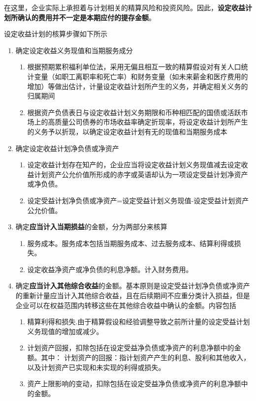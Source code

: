 \documentclass[UTF8,12pt]{ctexart}
\numberwithin{equation}{section} %
\numberwithin{figure}{section}
\numberwithin{table}{section}
\begin{document}
	在这里，企业实际上承担着与计划相关的精算风险和投资风险。因此，\textbf{设定收益计划所确认的费用并不一定是本期应付的提存金额}。
	
	设定收益计划的核算步骤如下所示
	\begin{enumerate}
		\item 确定设定收益义务现值和当期服务成分
		\begin{enumerate}
			\item 根据预期累积福利单位法，采用无偏且相互一致的精算假设对有关人口统计变量（如职工离职率和死亡率）和财务变量（如未来薪金和医疗费用的增加）等做出估计，计量设定收益计划所产生的义务，并确定相关义务的归属期间
			
			\item 根据资产负债表日与设定收益计划义务期限和币种相匹配的国债或活跃市场上的高质量公司债券的市场收益率确定折现率，将设定收益计划所产生的义务予以折现，以确定设定收益计划有无的现值和当期服务成本
		\end{enumerate}
		
		\item 确定设定收益计划净负债或净资产
		\begin{enumerate}
			\item 设定收益计划存在知产的，企业应当将设定收益计划义务现值减去设定收益计划资产公允价值所形成的赤字或英语却认为一项设定受益计划净资产或净负债。
			
			\item 设定受益计划净负债或净资产=设定受益计划义务现值-设定受益计划资产公允价值。
		\end{enumerate}
		
		\item 确定\textbf{应当计入当期损益}的金额，分为两部分来核算
		\begin{enumerate}
			\item 服务成本。服务成本包括当期服务成本、过去服务成本、结算利得或损失。
			
			\item 设定收益净资产或净负债的利息净额。计入财务费用。
		\end{enumerate}
		
		\item 确定\textbf{应当计入其他综合收益}的金额。基本原则是设定受益计划净负债或净资产的重新计量应当计入其他综合收益，且在后续期间不应重分类计入损益，但是企业可以在权益范围内转移这些在其他综合收益中确认的金额。内容包括
		\begin{enumerate}
			\item 精算利得和损失.由于精算假设和经验调整导致之前所计量的设定受益计划义务现值的增加或减少。
			
			\item 计划资产回报，扣除包括在设定受益净负债或净资产的利息净额中的金额。其中：
			计划资产的回报：指计划资产产生的利息、股利和其他收入，以及计划资产已实现和未实现的利得或损失。
			
			\item 资产上限影响的变动，扣除包括在设定受益净负债或净资产的利息净额中的金额。
		\end{enumerate}
	\end{enumerate}
\end{document}
